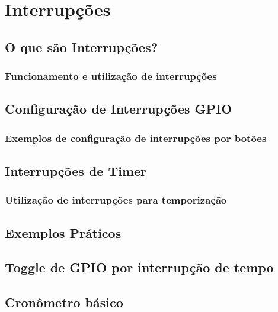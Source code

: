 \section{Interrupções}

\subsection{O que são Interrupções?}
\subsubsection{Funcionamento e utilização de interrupções}

\subsection{Configuração de Interrupções GPIO}
\subsubsection{Exemplos de configuração de interrupções por botões}

\subsection{Interrupções de Timer}
\subsubsection{Utilização de interrupções para temporização}

\subsection{Exemplos Práticos}
\subsection{Toggle de GPIO por interrupção de tempo}
\subsection{Cronômetro básico}